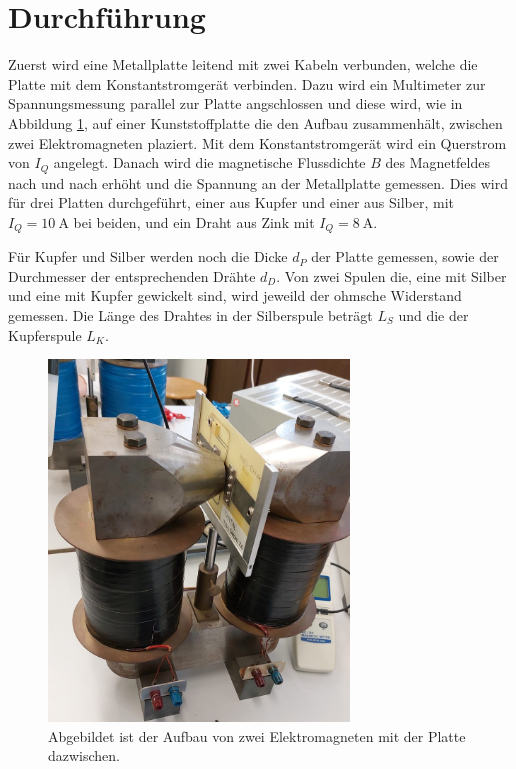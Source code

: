 \section{Durchführung}
\label{sec:Durchführung}

Zuerst wird eine Metallplatte leitend mit zwei Kabeln verbunden, welche die Platte mit dem Konstantstromgerät verbinden. 
Dazu wird ein Multimeter zur Spannungsmessung parallel zur Platte angschlossen und diese wird, wie in Abbildung \ref{fig:Elektromagnet}, auf einer Kunststoffplatte die den Aufbau zusammenhält, zwischen zwei Elektromagneten plaziert.
Mit dem Konstantstromgerät wird ein Querstrom von $I_Q$ angelegt.
Danach wird die magnetische Flussdichte $B$ des Magnetfeldes nach und nach erhöht und die Spannung an der Metallplatte gemessen.
Dies wird für drei Platten durchgeführt, einer aus Kupfer und einer aus Silber, mit $I_Q=\qty{10}{\ampere}$ bei beiden, und ein Draht aus Zink mit $I_Q=\qty{8}{\ampere}$.

Für Kupfer und Silber werden noch die Dicke $d_P$ der Platte gemessen, sowie der Durchmesser der entsprechenden Drähte $d_D$.
Von zwei Spulen die, eine mit Silber und eine mit Kupfer gewickelt sind, wird jeweild der ohmsche Widerstand gemessen.
Die Länge des Drahtes in der Silberspule beträgt $L_S$ und die der Kupferspule $L_K$.

 \begin{figure}[H]
     \centering
     \includegraphics[width=8cm]{Bilder/Elektromagnet.jpg}
     \caption{Abgebildet ist der Aufbau von zwei Elektromagneten mit der Platte dazwischen.}
     \label{fig:Elektromagnet}
 \end{figure}
